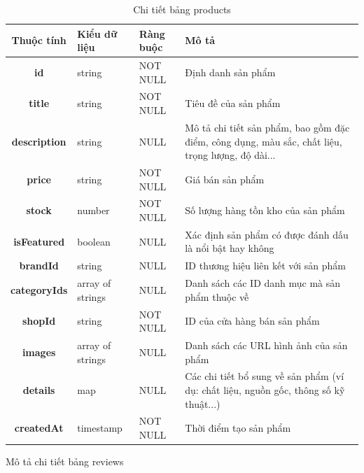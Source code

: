 \documentclass[../DoAn.tex]{subfiles}
\begin{document}
\begin{table}[H]
\centering
\begin{tabular}{|c|l|l|p{7cm}|}
\hline
\textbf{Thuộc tính} & \textbf{Kiểu dữ liệu} & \textbf{Ràng buộc} & \textbf{Mô tả} \\ \hline
\textbf{id} & string & NOT NULL & Định danh sản phẩm \\ \hline
\textbf{title} & string & NOT NULL & Tiêu đề của sản phẩm \\ \hline
\textbf{description} & string & NULL & Mô tả chi tiết sản phẩm, bao gồm đặc điểm, công dụng, màu sắc, chất liệu, trọng lượng, độ dài... \\ \hline
\textbf{price} & string & NOT NULL & Giá bán sản phẩm  \\ \hline
\textbf{stock} & number & NOT NULL & Số lượng hàng tồn kho của sản phẩm \\ \hline
\textbf{isFeatured} & boolean & NULL & Xác định sản phẩm có được đánh dấu là nổi bật hay không \\ \hline
\textbf{brandId} & string & NULL & ID thương hiệu liên kết với sản phẩm \\ \hline
\textbf{categoryIds} & array of strings & NULL & Danh sách các ID danh mục mà sản phẩm thuộc về \\ \hline
\textbf{shopId} & string & NOT NULL & ID của cửa hàng bán sản phẩm \\ \hline
\textbf{images} & array of strings & NULL & Danh sách các URL hình ảnh của sản phẩm \\ \hline
\textbf{details} & map & NULL & Các chi tiết bổ sung về sản phẩm (ví dụ: chất liệu, nguồn gốc, thông số kỹ thuật...) \\ \hline
\textbf{createdAt} & timestamp & NOT NULL & Thời điểm tạo sản phẩm \\ \hline
\end{tabular}
\caption{Chi tiết bảng products}
\label{tab:productsTable}
\end{table}
\FloatBarrier

Mô tả chi tiết bảng reviews
\end{document}
